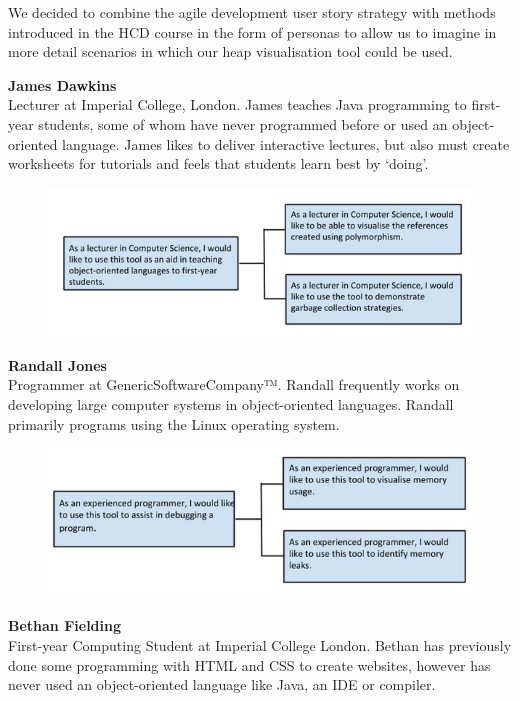 \documentclass[10pt, a4paper]{article}
\begin{document}
We decided to combine the agile development user story strategy with methods introduced in the HCD course in the form of personas to allow us to imagine in more detail scenarios in which our heap visualisation tool could be used.

\textbf{James Dawkins} 
\\ Lecturer at Imperial College, London. James teaches Java programming to first-year students, some of whom have never programmed before or used an object-oriented language. James likes to deliver interactive lectures, but also must create worksheets for tutorials and feels that students learn best by ‘doing’. 

\begin{figure}[h]
        \centering
        \includegraphics[width=\textwidth]{images/user1.jpg}
\end{figure}

\textbf{Randall Jones}
\\ Programmer at GenericSoftwareCompany™. Randall frequently works on developing large computer systems in object-oriented languages. Randall primarily programs using the Linux operating system.

\begin{figure}[h]
        \centering
        \includegraphics[width=\textwidth]{images/user2.jpg}
\end{figure} 

\textbf{Bethan Fielding}
\\ First-year Computing Student at Imperial College London. Bethan has previously done some programming with HTML and CSS to create websites, however has never used an object-oriented language like Java, an IDE or compiler.
\end{document}
